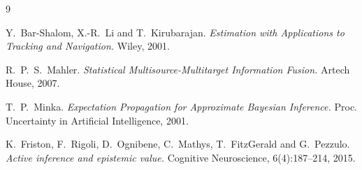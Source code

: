 \documentclass[11pt,a4paper]{report}
\begin{document}
\begin{thebibliography}{9}

Y.~Bar-Shalom, X.-R.~Li and T.~Kirubarajan.
\emph{Estimation with Applications to Tracking and Navigation.} Wiley, 2001.

R.~P.~S.~Mahler.
\emph{Statistical Multisource-Multitarget Information Fusion.} Artech House, 2007.

T.~P.~Minka.
\emph{Expectation Propagation for Approximate Bayesian Inference.}
Proc. Uncertainty in Artificial Intelligence, 2001.

K.~Friston, F.~Rigoli, D.~Ognibene, C.~Mathys, T.~FitzGerald and G.~Pezzulo.
\emph{Active inference and epistemic value.} Cognitive Neuroscience, 6(4):187--214, 2015.

\end{thebibliography}
\end{document}

